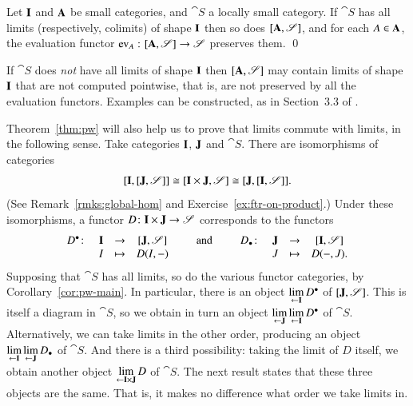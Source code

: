 \begin{cor}
\label{cor:pw-main}
Let $\mathbf{I}$ and $\mathbf{A}$ be small categories, and $\cat{S}$ a locally
small category.  If $\cat{S}$ has all limits (respectively, colimits) of
shape $\mathbf{I}$ then so does $[\mathbf{A},\mathscr{S}]$, and for each $A
\in \mathbf{A}$, the evaluation functor $\ev_A\from
\ftrcat{\scat{A}}{\cat{S}} \to \cat{S}$ preserves them.
\qed
\end{cor}

\begin{warning}
If $\cat{S}$ does \emph{not} have all limits of shape $\mathbf{I}$ then
$[\mathbf{A},\mathscr{S}]$ may contain limits of shape $\mathbf{I}$
that are not%
%
%
computed pointwise, that is, are not preserved by all the evaluation
functors.  Examples can be constructed, as in Section~3.3 of \citeKel.
\end{warning}

Theorem~\ref{thm:pw} will also help us to prove that limits commute with
limits, in the following sense.  Take categories $\mathbf{I}$, $\mathbf{J}$ and
$\cat{S}$.  There are isomorphisms of categories
\[
[\mathbf{I},[\mathbf{J},\mathscr{S}]]
\cong
[\mathbf{I} \times \mathbf{J},\mathscr{S}]
\cong
[\mathbf{J},[\mathbf{I},\mathscr{S}]].
\]
(See Remark~\ref{rmks:global-hom} and
Exercise~\ref{ex:ftr-on-product}.)  Under these isomorphisms, a functor
$D\from \scat{I} \times \scat{J} \to \cat{S}$ corresponds to the functors
\[
\begin{array}[t]{cccc}
D^\bl\from  &\scat{I}       &\to    &\ftrcat{\scat{J}}{\cat{S}}    \\
        &I              &\mapsto&D(I, \dashbk)
\end{array}
%
\qquad \text{and} \qquad
%
\begin{array}[t]{cccc}
D_\bl\from  &\scat{J}       &\to    &\ftrcat{\scat{I}}{\cat{S}}    \\
        &J              &\mapsto&D(\dashbk, J).
\end{array}%
%
\ntn{D-upper-lower}
%
\]
Supposing that $\cat{S}$ has all limits, so do the various functor
categories, by Corollary~\ref{cor:pw-main}.  In particular, there is an
object $\lim\limits_{\leftarrow \mathbf{I}} D^\bullet$ of $[\mathbf{J},\mathscr{S}]$.  This is
itself a diagram in $\cat{S}$, so we obtain in turn an object
$\lim\limits_{\leftarrow \mathbf{J}} \lim\limits_{\leftarrow \mathbf{I}} D^\bullet$ of $\cat{S}$.  Alternatively, we can
take limits in the other order, producing an object $\lim\limits_{\leftarrow \mathbf{I}}
\lim\limits_{\leftarrow \mathbf{J}} D_\bullet$ of $\cat{S}$.  And there is a third possibility:
taking the limit of $D$ itself, we obtain another object $\lim\limits_{\leftarrow \mathbf{I}
  \times \mathbf{J}} D$ of $\cat{S}$.  The next result states that these
three objects are the same.  That is, it makes no difference what order we
take limits in.

